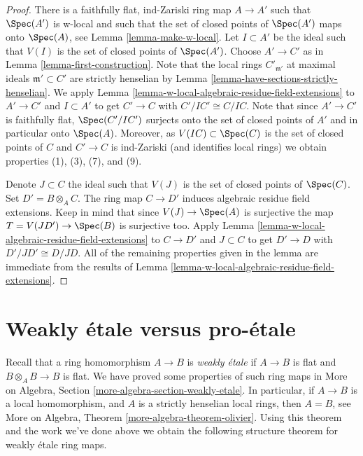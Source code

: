 \begin{proof}
There is a faithfully flat, ind-Zariski ring map $A \to A'$ such that
$\Spec(A')$ is w-local and such that the set of closed points of
$\Spec(A')$ maps onto $\Spec(A)$, see Lemma \ref{lemma-make-w-local}.
Let $I \subset A'$ be the ideal such that $V(I)$ is the set
of closed points of $\Spec(A')$.
Choose $A' \to C'$ as in Lemma \ref{lemma-first-construction}.
Note that the local rings $C'_{\mathfrak m'}$ at maximal ideals
$\mathfrak m' \subset C'$ are strictly henselian by
Lemma \ref{lemma-have-sections-strictly-henselian}.
We apply Lemma \ref{lemma-w-local-algebraic-residue-field-extensions}
to $A' \to C'$ and $I \subset A'$ to get $C' \to C$ with $C'/IC' \cong C/IC$.
Note that since $A' \to C'$ is faithfully flat, $\Spec(C'/IC')$
surjects onto the set of closed points of $A'$ and in particular
onto $\Spec(A)$. Moreover, as $V(IC) \subset \Spec(C)$
is the set of closed points of $C$ and $C' \to C$ is ind-Zariski
(and identifies local rings) we obtain properties (1), (3), (7), and (9).

\medskip\noindent
Denote $J \subset C$ the ideal such that $V(J)$ is the set of closed
points of $\Spec(C)$. Set $D' = B \otimes_A C$. The ring
map $C \to D'$ induces algebraic residue field extensions. Keep in mind that
since $V(J) \to \Spec(A)$ is surjective the map $T = V(JD') \to \Spec(B)$
is surjective too. Apply
Lemma \ref{lemma-w-local-algebraic-residue-field-extensions}
to $C \to D'$ and $J \subset C$ to get 
$D' \to D$ with $D'/JD' \cong D/JD$.
All of the remaining properties given in the lemma are
immediate from the results of
Lemma \ref{lemma-w-local-algebraic-residue-field-extensions}.
\end{proof}








\section{Weakly \'etale versus pro-\'etale}
\label{section-weakly-etale}

\noindent
Recall that a ring homomorphism $A \to B$ is {\it weakly \'etale}
if $A \to B$ is flat and $B \otimes_A B \to B$ is flat. We have
proved some properties of such ring maps in
More on Algebra, Section \ref{more-algebra-section-weakly-etale}.
In particular, if $A \to B$ is a local homomorphism, and $A$ is a
strictly henselian local rings, then $A = B$, see
More on Algebra, Theorem \ref{more-algebra-theorem-olivier}.
Using this theorem and the work we've done above we obtain
the following structure theorem for weakly \'etale ring maps.

